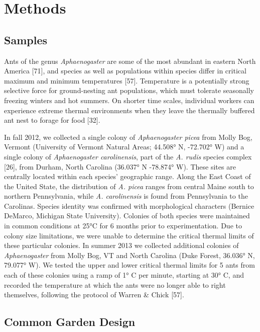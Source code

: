\documentclass[]{article}
\begin{document}
\section{Methods}\label{methods}

\subsection{Samples}\label{samples}

Ants of the genus \emph{Aphaenogaster} are some of the most abundant in
eastern North America {[}71{]}, and species as well as populations
within species differ in critical maximum and minimum temperatures
{[}57{]}. Temperature is a potentially strong selective force for
ground-nesting ant populations, which must tolerate seasonally freezing
winters and hot summers. On shorter time scales, individual workers can
experience extreme thermal environments when they leave the thermally
buffered ant nest to forage for food {[}32{]}.

In fall 2012, we collected a single colony of \emph{Aphaenogaster picea}
from Molly Bog, Vermont (University of Vermont Natural Areas; 44.508° N,
-72.702° W) and a single colony of \emph{Aphaenogaster carolinensis},
part of the \emph{A. rudis} species complex {[}26{]}, from Durham, North
Carolina (36.037° N -78.874° W). These sites are centrally located
within each species' geographic range. Along the East Coast of the
United State, the distribution of \emph{A. picea} ranges from central
Maine south to northern Pennsylvania, while \emph{A. carolinensis} is
found from Pennsylvania to the Carolinas. Species identity was confirmed
with morphological characters (Bernice DeMarco, Michigan State
University). Colonies of both species were maintained in common
conditions at 25°C for 6 months prior to experimentation. Due to colony
size limitations, we were unable to determine the critical thermal
limits of these particular colonies. In summer 2013 we collected
additional colonies of \emph{Aphaenogaster} from Molly Bog, VT and North
Carolina (Duke Forest, 36.036° N, 79.077° W). We tested the upper and
lower critical thermal limits for 5 ants from each of these colonies
using a ramp of 1° C per minute, starting at 30° C, and recorded the
temperature at which the ants were no longer able to right themselves,
following the protocol of Warren \& Chick {[}57{]}.

\subsection{Common Garden Design}\label{common-garden-design}
\end{document}
